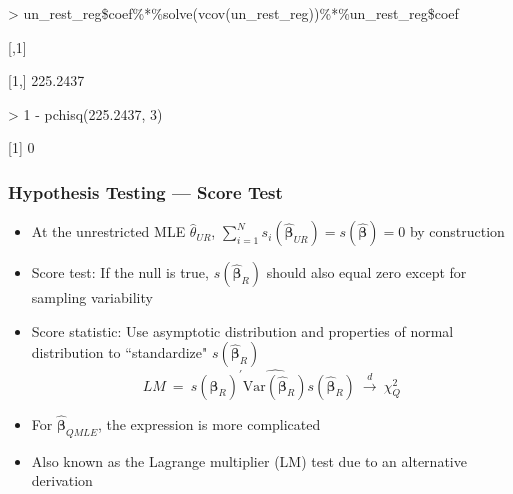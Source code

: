 \documentclass{beamer}
\begin{document}
\begin{frame}

\small
\begin{semiverbatim}

> un\_rest\_reg\$coef\%*\%solve(vcov(un\_rest\_reg))\%*\%un\_rest\_reg\$coef

         [,1]

[1,] 225.2437


> 1 - pchisq(225.2437, 3)

[1] 0


\end{semiverbatim}



\end{frame}



\begin{frame}
\frametitle{Hypothesis Testing --- Score Test}
\begin{itemize}[<+->]
\item At the unrestricted MLE $\hat\theta_{UR}$, $\sum_{i=1}^{N} s_{i} (\widehat{\boldsymbol{\beta}}_{UR})=s(\widehat{\boldsymbol{\beta}}) = 0$ by construction
\item \alert{Score test}: If the null is true, $s(\widehat{\boldsymbol{\beta}}_{R})$
  should also equal zero except for sampling variability
\item Score statistic: Use asymptotic distribution and properties of normal distribution to  ``standardize" $s(\widehat{\boldsymbol{\beta}}_{R})$
$$ LM \ = \ s(\widehat{\boldsymbol{\beta}}_{R})^{'} \widehat{\text{Var}(\widehat{\boldsymbol{\beta}}_{R})} s(\widehat{\boldsymbol{\beta}}_{R})
\ \stackrel{d}{\longrightarrow} \ \chi_Q^2$$

\item For $\widehat{\boldsymbol{\beta}}_{QMLE}$, the expression is more complicated
\item Also known as the \alert{Lagrange multiplier} (LM) test due to an alternative derivation

\end{itemize}

\end{frame}
\end{document}
